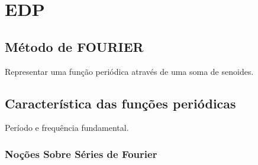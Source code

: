 \chapter{EDP}

\section{Método de FOURIER}

Representar uma função periódica através de uma soma de senoides.

\section{Característica das funções periódicas}

Período e frequência fundamental.



\subsection{Noções Sobre Séries de Fourier}

